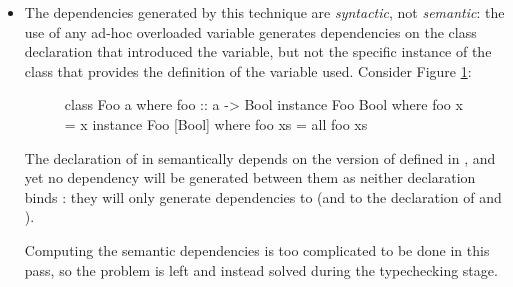 \documentclass[dissertation.tex]{subfiles}
\begin{document}
{{{\begin{itemize}
{                Variable declarations such as  are usually treated as being the unique binding
                definition of , and any other uses within the same level of scope must be free rather than
                binding (otherwise we have conflicting definitions).
                
                However, we treat binding declarations inside  declarations as actually being free
                uses rather than binding uses, so that the instance declaration forms a dependence on the class
                declaration where the variables are bound, ensuring it is typechecked first.

            }
            \item
            {

                The dependencies generated by this technique are \textit{syntactic}, not \textit{semantic}: the use of
                any ad-hoc overloaded variable generates dependencies on the class declaration that introduced the
                variable, but not the specific instance of the class that provides the definition of the variable used.
                Consider Figure \ref{code:syntactic-vs-semantic}:

                \begin{figure}[h]
                \begin{haskellfigure}
                class Foo a where
                    foo :: a -> Bool
                instance Foo Bool where
                    foo x = x
                instance Foo [Bool] where
                    foo xs = all foo xs
                \end{haskellfigure}
                \caption{}
                \label{code:syntactic-vs-semantic}
                \end{figure}

                The declaration of  in  semantically depends on the version of
                 defined in , and yet no dependency will be generated between
                them as neither declaration binds : they will only generate dependencies to  (and to the declaration of  and ).

                Computing the semantic dependencies is too complicated to be done in this pass, so the problem is left
                and instead solved during the typechecking stage.

            }
            \end{itemize}

        }
    }
}
\end{document}
